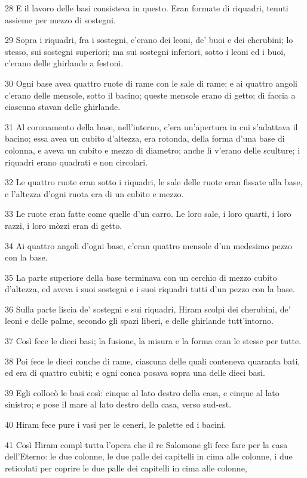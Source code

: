 \par 28 E il lavoro delle basi consisteva in questo. Eran formate di riquadri, tenuti assieme per mezzo di sostegni.
\par 29 Sopra i riquadri, fra i sostegni, c'erano dei leoni, de' buoi e dei cherubini; lo stesso, sui sostegni superiori; ma sui sostegni inferiori, sotto i leoni ed i buoi, c'erano delle ghirlande a festoni.
\par 30 Ogni base avea quattro ruote di rame con le sale di rame; e ai quattro angoli c'erano delle mensole, sotto il bacino; queste mensole erano di getto; di faccia a ciascuna stavan delle ghirlande.
\par 31 Al coronamento della base, nell'interno, c'era un'apertura in cui s'adattava il bacino; essa avea un cubito d'altezza, era rotonda, della forma d'una base di colonna, e aveva un cubito e mezzo di diametro; anche lì v'erano delle sculture; i riquadri erano quadrati e non circolari.
\par 32 Le quattro ruote eran sotto i riquadri, le sale delle ruote eran fissate alla base, e l'altezza d'ogni ruota era di un cubito e mezzo.
\par 33 Le ruote eran fatte come quelle d'un carro. Le loro sale, i loro quarti, i loro razzi, i loro mòzzi eran di getto.
\par 34 Ai quattro angoli d'ogni base, c'eran quattro mensole d'un medesimo pezzo con la base.
\par 35 La parte superiore della base terminava con un cerchio di mezzo cubito d'altezza, ed aveva i suoi sostegni e i suoi riquadri tutti d'un pezzo con la base.
\par 36 Sulla parte liscia de' sostegni e sui riquadri, Hiram scolpì dei cherubini, de' leoni e delle palme, secondo gli spazi liberi, e delle ghirlande tutt'intorno.
\par 37 Così fece le dieci basi; la fusione, la misura e la forma eran le stesse per tutte.
\par 38 Poi fece le dieci conche di rame, ciascuna delle quali conteneva quaranta bati, ed era di quattro cubiti; e ogni conca posava sopra una delle dieci basi.
\par 39 Egli collocò le basi così: cinque al lato destro della casa, e cinque al lato sinistro; e pose il mare al lato destro della casa, verso sud-est.
\par 40 Hiram fece pure i vasi per le ceneri, le palette ed i bacini.
\par 41 Così Hiram compì tutta l'opera che il re Salomone gli fece fare per la casa dell'Eterno: le due colonne, le due palle dei capitelli in cima alle colonne, i due reticolati per coprire le due palle dei capitelli in cima alle colonne,
